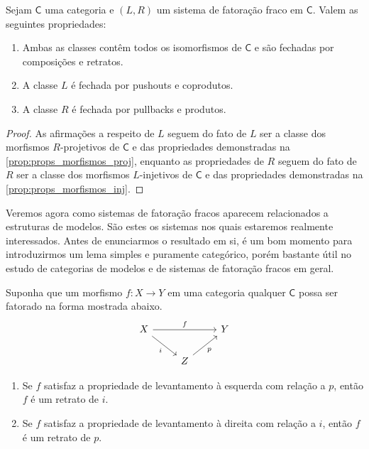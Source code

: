 \begin{prop}\label{prop:propriedades_fatoracao_fraca}
  Sejam $\mathsf{C}$ uma categoria e $(L,R)$ um sistema de fatoração fraco em $\mathsf{C}$.
  Valem as seguintes propriedades:
  \begin{enumerate}
  \item Ambas as classes contêm todos os isomorfismos de $\mathsf{C}$ e são fechadas por composições e retratos.
    
  \item A classe $L$ é fechada por pushouts e coprodutos.
    
  \item A classe $R$ é fechada por pullbacks e produtos.
  \end{enumerate}
\end{prop}

\begin{proof}
  As afirmações a respeito de $L$ seguem do fato de $L$ ser a classe dos morfismos $R$-projetivos de $\mathsf{C}$ e das propriedades demonstradas na \cref{prop:props_morfismos_proj}, enquanto as propriedades de $R$ seguem do fato de $R$ ser a classe dos morfismos $L$-injetivos de $\mathsf{C}$ e das propriedades demonstradas na \cref{prop:props_morfismos_inj}.
\end{proof}

Veremos agora como sistemas de fatoração fracos aparecem relacionados a estruturas de modelos.
São estes os sistemas nos quais estaremos realmente interessados.
Antes de enunciarmos o resultado em si, é um bom momento para introduzirmos um lema simples e puramente categórico, porém bastante útil no estudo de categorias de modelos e de sistemas de fatoração fracos em geral.

\begin{lema}\label{lema:argumento_do_retrato}
  Suponha que um morfismo $f: X \to Y$ em uma categoria qualquer $\mathsf{C}$ possa ser fatorado na forma mostrada abaixo.
  \begin{displaymath}
    \begin{tikzcd}
      X
      \arrow[rr, "f"]
      \arrow[rd, "i" swap]
      & & Y
      \\ & Z
      \arrow[ru, "p" swap]
    \end{tikzcd}
  \end{displaymath}
  \begin{enumerate}
    \item Se $f$ satisfaz a propriedade de levantamento à esquerda com relação a $p$, então $f$ é um retrato de $i$.

    \item Se $f$ satisfaz a propriedade de levantamento à direita com relação a $i$, então $f$ é um retrato de $p$.
  \end{enumerate}
\end{lema}

